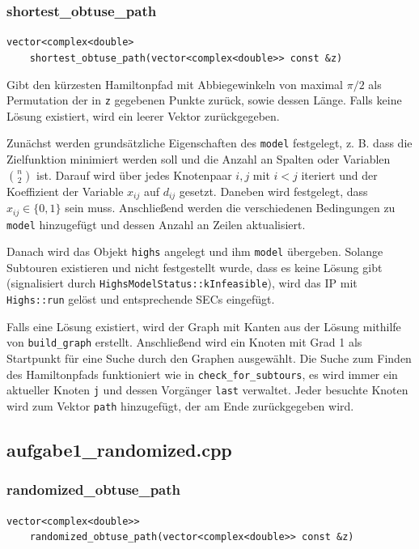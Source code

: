 \documentclass[a4paper, 10pt, ngerman]{article}
\begin{document}
\subsubsection{shortest\_obtuse\_path}

\verb|vector<complex<double>| \\
\verb|    shortest_obtuse_path(vector<complex<double>> const &z)|
\medskip

\noindent Gibt den kürzesten Hamiltonpfad mit Abbiegewinkeln von maximal $\pi / 2$ als Permutation der in \verb|z| gegebenen Punkte zurück, sowie dessen Länge. Falls keine Lösung existiert, wird ein leerer Vektor zurückgegeben.

Zunächst werden grundsätzliche Eigenschaften des \verb|model| festgelegt, z. B. dass die Zielfunktion minimiert werden soll und die Anzahl an Spalten oder Variablen $\binom n 2$ ist. Darauf wird über jedes Knotenpaar $i, j$ mit $i < j$ iteriert und der Koeffizient der Variable $x_{ij}$ auf $d_{ij}$ gesetzt. Daneben wird festgelegt, dass $x_{ij} \in \{0, 1\}$ sein muss. Anschließend werden die verschiedenen Bedingungen zu \verb|model| hinzugefügt und dessen Anzahl an Zeilen aktualisiert.

Danach wird das Objekt \verb|highs| angelegt und ihm \verb|model| übergeben. Solange Subtouren existieren und nicht festgestellt wurde, dass es keine Lösung gibt (signalisiert durch \verb|HighsModelStatus::kInfeasible|), wird das IP mit \verb|Highs::run| gelöst und entsprechende SECs eingefügt.

Falls eine Lösung existiert, wird der Graph mit Kanten aus der Lösung mithilfe von \verb|build_graph| erstellt. Anschließend wird ein Knoten mit Grad 1 als Startpunkt für eine Suche durch den Graphen ausgewählt. Die Suche zum Finden des Hamiltonpfads funktioniert wie in \verb|check_for_subtours|, es wird immer ein aktueller Knoten \verb|j| und dessen Vorgänger \verb|last| verwaltet. Jeder besuchte Knoten wird zum Vektor \verb|path| hinzugefügt, der am Ende zurückgegeben wird.

\subsection{aufgabe1\_randomized.cpp}

\subsubsection{randomized\_obtuse\_path}

\verb|vector<complex<double>>| \\
\verb|    randomized_obtuse_path(vector<complex<double>> const &z)|
\medskip
\end{document}
